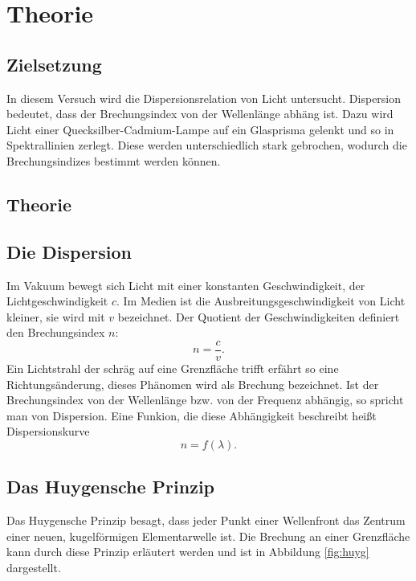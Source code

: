 \section{Theorie}
\label{sec:Theorie}

\subsection{Zielsetzung}
In diesem Versuch wird die Dispersionsrelation von Licht untersucht.
Dispersion bedeutet, dass der Brechungsindex von der Wellenlänge
abhäng ist.
Dazu wird Licht einer Quecksilber-Cadmium-Lampe auf ein Glasprisma
gelenkt und so in Spektrallinien zerlegt. Diese werden unterschiedlich
stark gebrochen, wodurch die Brechungsindizes bestimmt werden können.

\subsection{Theorie}
\subsection{Die Dispersion}

Im Vakuum bewegt sich Licht mit einer konstanten Geschwindigkeit, der
Lichtgeschwindigkeit $c$. Im Medien ist die Ausbreitungsgeschwindigkeit
von Licht kleiner, sie wird mit $v$ bezeichnet.
Der Quotient der Geschwindigkeiten definiert den
Brechungsindex $n$:
\begin{equation}
  n=\frac{c}{v}.
  \label{eqn:n}
\end{equation}
Ein Lichtstrahl der schräg auf eine Grenzfläche trifft erfährt so eine
Richtungsänderung, dieses Phänomen wird als Brechung bezeichnet.
Ist der Brechungsindex von der Wellenlänge bzw. von der Frequenz
abhängig, so spricht man von Dispersion. Eine Funkion, die diese
Abhängigkeit beschreibt heißt Dispersionskurve
\begin{equation}
  n=f(\lambda).
\end{equation}

\subsection{Das Huygensche Prinzip}
Das Huygensche Prinzip besagt, dass jeder Punkt einer Wellenfront das
Zentrum einer neuen, kugelförmigen Elementarwelle ist.
Die Brechung an einer Grenzfläche kann durch diese Prinzip erläutert werden und
ist in Abbildung \ref{fig:huyg} dargestellt.

